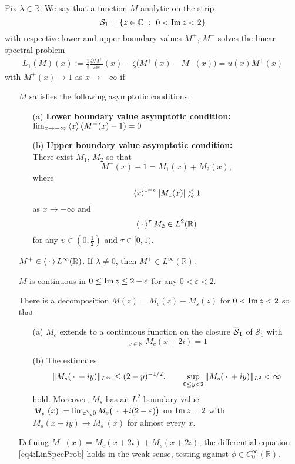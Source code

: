\documentclass[../dissertation.tex]{subfiles}
\begin{document}
\begin{defn}\label{dfn4:DEsoln}
	Fix $\lambda \in \mathbb R$. We say that a function $M$ analytic on the strip
	$$\mathcal S_1 = \{ z \in \mathbb C ~:~ 0 < \operatorname{Im} z < 2 \}$$ with respective
	lower and upper boundary values $M^+$, $M^-$ solves the linear spectral problem
	\begin{align} \label{eq4:LinSpecProb}
		L_1(M)(x) 
			:= \frac{1}{i} \frac{\partial M^+}{\partial x}(x)
				- \zeta \big(M^+(x) - M^-(x)\big)
			= u(x) M^+(x)
	\end{align}
	with $M^+(x) \to 1$ as $x\to -\infty$ if 
	\begin{itemize}
		\item[\namedlabel{itm:asymp}{(i)}] $M$ satisfies the following asymptotic conditions:
			\begin{itemize}
				\item[(a)] \textbf{Lower boundary value asymptotic condition:}\\
					$\lim_{x\to-\infty} \left\langle x \right\rangle \left(M^+(x) -1\right)=0$
				\item[(b)] \textbf{Upper boundary value asymptotic condition:}\\
					There exist $M_1$, $M_2$ so that 
					\[
						M^-(x) -1 = M_1(x) + M_2(x), 
					\]
					where 
					\[
						\left\langle x \right\rangle^{1+\upsilon} | M_1(x) | \lesssim 1
					\]
					as $x\to -\infty$ and 
					\[
						\left\langle \kern 0.5ex \cdot \kern 0.5ex \right\rangle^\tau M_2 \in L^2(\mathbb R)
					\]
					for any $\upsilon \in \left(0, \frac{1}{2}\right)$ and $\tau \in [0,1)$.
			\end{itemize} 
		\item[\namedlabel{itm:space}{(ii)}] $M^+ \in \left\langle \kern 0.5ex \cdot \kern 0.5ex \right\rangle L^\infty(\mathbb R)$. 
			If $\lambda \ne 0$, then $M^+ \in L^\infty(\mathbb R)$.
		\item[\namedlabel{itm:cont}{(iii)}] $M$ is continuous in $0 \leq \operatorname{Im} z \leq 2-\varepsilon$
			for any $0 < \varepsilon < 2$.
		\item[\namedlabel{itm:decomp}{(iv)}] There is a decomposition $M(z) = M_c(z) + M_s(z)$ for 
			$0 < \operatorname{Im}  z < 2$ so that 
			\begin{itemize}
				\item[(a)] $M_c$ extends to a continuous function on the closure
					$\overline{\mathcal S}_1$ of $\mathcal S_1$ with 
					\[
						\mathop{\lim_{x\to-\infty}}_{x\in \mathbb R} M_c(x+2i) = 1	
					\]
				\item[(b)] The estimates
					\[
						\|M_s(\kern 0.5ex \cdot \kern 0.5ex+iy)\|_{L^\infty} \leq (2-y)^{-1/2}, \qquad
						\sup_{0\leq y < 2} \|M_s(\kern 0.5ex \cdot \kern 0.5ex+iy)\|_{L^2} < \infty
					\]
					hold. Moreover, $M_s$ has an $L^2$ boundary value 
					$M_s^-(x):= \lim_{\varepsilon \searrow 0} M_s\big(\kern 0.5ex \cdot \kern 0.5ex+i(2-\varepsilon)\big)$
					on $\operatorname{Im} z = 2$ with $M_s(x+iy) \to M_s^-(x)$ for almost every
					$x$.
			\end{itemize}
		\item[\namedlabel{itm:jost}{(v)}] Defining $M^-(x) = M_c(x+2i) + M_s(x+2i)$, the dif{}ferential equation
			\eqref{eq4:LinSpecProb} holds in the weak sense, testing against 
			$\phi \in C_0^\infty(\mathbb R)$.
	\end{itemize}
\end{defn}
\end{document}
